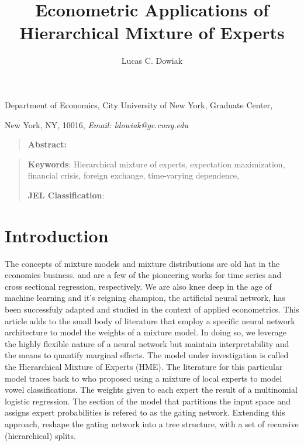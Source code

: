 \documentclass[12pt]{article}
\title{Econometric Applications of Hierarchical Mixture of Experts}
\author{Lucas C. Dowiak}
\begin{document}
 
\maketitle{}


Department of Economics, City University of New York\smallskip, Graduate
Center,

New York, NY, 10016, \textit{Email: ldowiak@gc.cuny.edu}

\qquad

\begin{quotation}
\textbf{Abstract:}
\end{quotation}

\vspace{1pt}

\begin{quotation}
\textbf{Keywords}: Hierarchical mixture of experts, expectation maximization,
financial crisis, foreign exchange, time-varying dependence,

\textbf{JEL Classification}: 
\end{quotation}

\vspace{1pt}

\section{Introduction}

The concepts of mixture models and mixture distributions are old hat
in the economics business. \cite{Hamilton1989} and \cite{GoldfeldQuant1973}
are a few of the pioneering works for time series and cross sectional
regression, respectively. We are also knee deep in the age of machine
learning and it's reigning champion, the artificial neural network, has
been successfuly adapted and studied in the context of applied econometrics.
This article adds to the small body of literature that employ a specific
neural network architecture to model the weights of a mixture model. In doing
so, we leverage the highly flexible nature of a neural network but maintain
interpretability and the means to quantify marginal effects.
The model under investigation is called the Hierarchical Mixture
of Experts (HME). The literature for this particular model traces back to
\cite{JJNH1991} who proposed using a mixture of local experts to model vowel
classifications. The weights given to each expert the result of a multinomial
logistic regression. The section of the model that partitions the input space
and assigns expert probabilities is refered to as the gating network. Extending
this approach, \cite{JordanJacobs1993} reshape the gating network into a
tree structure, with a set of recursive (hierarchical) splits.
\end{document}
